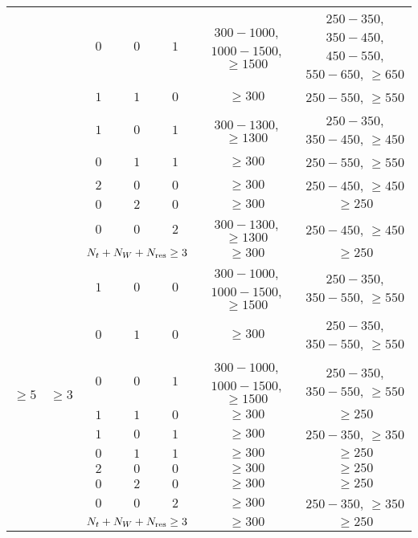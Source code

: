 \begin{table}[!ht]
\begin{center}
{\begin{tabular}{|c|c|c|c|c|c|c|}
						  &					   & $0$			 & $0$				    & $1$	  		& $300-1000$, $1000-1500$, $\geq1500$ & $250-350$, $350-450$, $450-550$, $550-650$, $\geq650$ \\
						  &					   & $1$	 		 & $1$					& $0$			& $\geq300$ 						& $250-550$, $\geq550$ \\
						  &					   & $1$	 		 & $0$					& $1$	  		& $300-1300$, $\geq1300$ & $250-350$, $350-450$, $\geq450$ \\
						  &					   & $0$			 & $1$					& $1$	  		& $\geq300$							& $250-550$, $\geq550$ \\
						  &					   & $2$	 		 & $0$					& $0$			& $\geq300$ 						& $250-450$, $\geq450$ \\
						  &					   & $0$	 		 & $2$					& $0$	  		& $\geq300$ 						& $\geq250$ \\
						  &					   & $0$			 & $0$					& $2$	  		& $300-1300$, $\geq1300$ & $250-450$, $\geq450$ \\
						  &					   & \multicolumn{3}{|c|}{$N_{t}+N_{W}+N_{\text{res}}\geq3$} & $\geq300$ 					   & $\geq250$ \\
	\hline
	\multirow{10}{*}{$\geq5$} & \multirow{10}{*}{$\geq3$} & $1$ & $0$ & $0$ & $300-1000$, $1000-1500$, $\geq1500$ & $250-350$, $350-550$, $\geq550$\\
						  &					   & $0$			 & $1$					& $0$			& $\geq300$ 						& $250-350$, $350-550$, $\geq550$\\
						  &					   & $0$			 & $0$				    & $1$	  		& $300-1000$, $1000-1500$, $\geq1500$ & $250-350$, $350-550$, $\geq550$\\
						  &					   & $1$	 		 & $1$					& $0$			& $\geq300$ 						& $\geq250$ \\
						  &					   & $1$	 		 & $0$					& $1$	  		& $\geq300$ 						& $250-350$, $\geq350$ \\
						  &					   & $0$			 & $1$					& $1$	  		& $\geq300$							& $\geq250$ \\
						  &					   & $2$	 		 & $0$					& $0$			& $\geq300$ 						& $\geq250$ \\
						  &					   & $0$	 		 & $2$					& $0$	  		& $\geq300$ 						& $\geq250$ \\
						  &					   & $0$			 & $0$					& $2$	  		& $\geq300$ 					   & $250-350$, $\geq350$ \\
						  &					   & \multicolumn{3}{|c|}{$N_{t}+N_{W}+N_{\text{res}}\geq3$} & $\geq300$ 					   & $\geq250$ \\
	\hline
\end{tabular}
}
\end{center}
\end{table}


